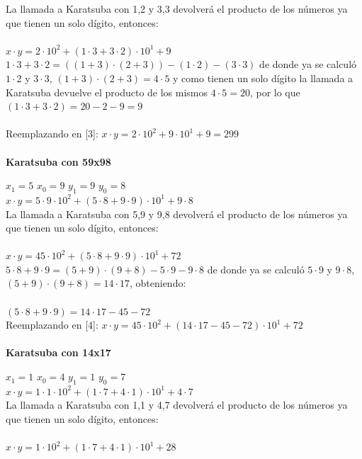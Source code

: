 \documentclass[titlepage,a4paper]{article}
\begin{document}
La llamada a Karatsuba con 1,2 y 3,3 devolverá el producto de los números ya que tienen un solo dígito, entonces: \\ \\
$x\cdot y= 2 \cdot 10^2 + (1\cdot 3 + 3 \cdot 2)\cdot 10^1 + 9$ \qquad [3]\\ 

$1 \cdot3 + 3\cdot2 = ((1+3)\cdot (2+3)) - (1\cdot 2) - (3\cdot 3)$  de donde ya se calculó $1\cdot 2$ y $3\cdot 3$, $(1+3)\cdot (2+3) = 4\cdot5$ y como tienen un solo dígito la llamada a Karatsuba devuelve el producto de los mismos $4\cdot5=20$, por lo que $ (1\cdot 3 + 3 \cdot 2) = 20 - 2 - 9 =9 $ \\ \\ 
Reemplazando en [3]: $x\cdot y= 2 \cdot 10^2 + 9\cdot 10^1 + 9 = 299$ \\ \\


\textbf{Karatsuba con 59x98} \par
\qquad $x_1=5$ \quad $x_0=9$ \quad $y_1=9$ \quad $y_0=8$ \\
$x\cdot y= 5 \cdot 9 \cdot 10^2 + (5\cdot 8 + 9 \cdot 9)\cdot 10^1 + 9\cdot 8$ \\ 

La llamada a Karatsuba con 5,9 y 9,8 devolverá el producto de los números ya que tienen un solo dígito, entonces: \\ \\
$x\cdot y= 45 \cdot 10^2 + (5\cdot 8 + 9 \cdot 9)\cdot 10^1 + 72$ \qquad [4]\\ 

$5 \cdot8 + 9\cdot9 = (5+9)\cdot (9+8) - 5\cdot 9 - 9\cdot 8$ de donde ya se calculó $5\cdot 9$ y $9\cdot 8$, $(5+9)\cdot (9+8) = 14\cdot17$, obteniendo: \\ \\
$ (5\cdot 8 + 9 \cdot 9) = 14\cdot17 - 45 - 72 $ \\ 

Reemplazando en [4]: \qquad $x\cdot y= 45 \cdot 10^2 + (14\cdot17 - 45 - 72)\cdot 10^1 + 72$ \\ \\


\textbf{Karatsuba con 14x17} \par
\qquad $x_1=1$ \quad $x_0=4$ \quad $y_1=1$ \quad $y_0=7$ \\
$x\cdot y= 1 \cdot 1 \cdot 10^2 + (1\cdot 7 + 4 \cdot 1)\cdot 10^1 + 4\cdot 7$ \\ 

La llamada a Karatsuba con 1,1 y 4,7 devolverá el producto de los números ya que tienen un solo dígito, entonces: \\ \\
$x\cdot y= 1 \cdot 10^2 + (1\cdot 7 + 4 \cdot 1)\cdot 10^1 + 28$ \qquad [5]\\ 
\end{document}
